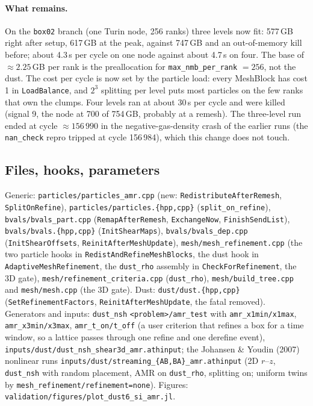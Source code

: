 \documentclass[11pt]{article}
\newcommand{\code}[1]{\texttt{#1}}
\newcommand{\file}[1]{\texttt{\small #1}}
\newcommand{\fn}[1]{\texttt{\small #1}}
\begin{document}
\paragraph{What remains.} On the \code{box02} branch (one Turin node, 256 ranks) three
levels now fit: 577\,GB right after setup, 617\,GB at the peak, against 747\,GB and an
out-of-memory kill before; about 4.3\,s per cycle on one node against about 4.7\,s on four.
The base of $\approx 2.25$\,GB per rank is the preallocation for
\code{max\_nmb\_per\_rank} $= 256$, not the dust. The cost per cycle is now set by the
particle load: every MeshBlock has cost 1 in \fn{LoadBalance}, and $2^3$ splitting per level
puts most particles on the few ranks that own the clumps. Four levels ran at about 30\,s per
cycle and were killed (signal 9, the node at 700 of 754\,GB, probably at a remesh). The
three-level run ended at cycle $\approx 156\,990$ in the negative-gas-density crash of the
earlier runs (the \code{nan\_check} repro tripped at cycle 156\,984), which this change does
not touch.

\subsection{Files, hooks, parameters}

Generic: \file{particles/particles\_amr.cpp} (new: \fn{RedistributeAfterRemesh},
\fn{SplitOnRefine}), \file{particles/particles.\{hpp,cpp\}} (\code{split\_on\_refine}),
\file{bvals/bvals\_part.cpp} (\fn{RemapAfterRemesh}, \fn{ExchangeNow},
\fn{FinishSendList}), \file{bvals/bvals.\{hpp,cpp\}} (\fn{InitShearMaps}),
\file{bvals/bvals\_dep.cpp} (\fn{InitShearOffsets}, \fn{ReinitAfterMeshUpdate}),
\file{mesh/mesh\_refinement.cpp} (the two particle hooks in
\fn{RedistAndRefineMeshBlocks}, the dust hook in \fn{AdaptiveMeshRefinement}, the
\code{dust\_rho} assembly in \fn{CheckForRefinement}, the 3D gate),
\file{mesh/refinement\_criteria.cpp} (\code{dust\_rho}), \file{mesh/build\_tree.cpp} and
\file{mesh/mesh.cpp} (the 3D gate). Dust: \file{dust/dust.\{hpp,cpp\}}
(\fn{SetRefinementFactors}, \fn{ReinitAfterMeshUpdate}, the fatal removed).
Generators and inputs: \code{dust\_nsh} \code{<problem>/amr\_test} with
\code{amr\_x1min/x1max}, \code{amr\_x3min/x3max}, \code{amr\_t\_on/t\_off} (a user
criterion that refines a box for a time window, so a lattice passes through one refine
and one derefine event), \file{inputs/dust/dust\_nsh\_shear3d\_amr.athinput}; the
Johansen \& Youdin (2007) nonlinear runs \file{inputs/dust/streaming\_\{AB,BA\}\_amr.athinput}
(2D $r$--$z$, \code{dust\_nsh} with random placement, AMR on \code{dust\_rho}, splitting on;
uniform twins by \code{mesh\_refinement/refinement=none}). Figures:
\file{validation/figures/plot\_dust6\_si\_amr.jl}.
\end{document}
